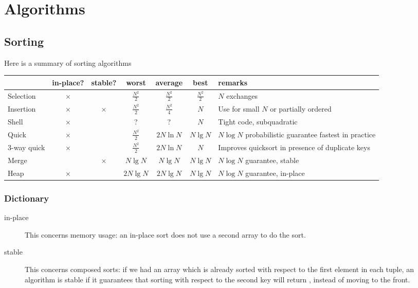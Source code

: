 \chapter{Algorithms}

\section{Sorting}
Here is a summary of sorting algorithms


\begin{tabular}{|p{15mm}||c c c c c p{2.5cm}|}
\hline
& in-place? & stable? & worst & average & best & remarks\\
\hline \hline
Selection & $\times$ & & $\frac{N^2}{2}$ & $\frac{N^2}{2}$ & $\frac{N^2}{2}$ & $N$ exchanges \\
Insertion & $\times$ & $\times$ & $\frac{N^2}{2}$ & $\frac{N^2}{4}$ & $N$ & Use for small $N$ or partially ordered \\
Shell & $\times$ &  & ? & ? & $N$ & Tight code, subquadratic \\
Quick & $\times$ & & $\frac{N^2}{2}$ & $2N \ln N$ & $N \lg N$ & $N \log N$ probabilistic guarantee fastest in practice \\
3-way quick & $\times$ & & $\frac{N^2}{2}$ & $2N \ln N$ & $N$ & Improves quicksort in presence of duplicate keys \\
Merge& & $\times$ & $N \lg N$ & $N \lg N$ & $N \lg N$ & $N \log N$ guarantee, stable \\
Heap& $\times$ & & $2 N \lg N$ & $2 N \lg N$ & $N \lg N$ & $N \log N$ guarantee, in-place \\
\hline
\end{tabular}

\subsection{Dictionary}

\begin{description}
\item[in-place] This concerns memory usage: an in-place sort does not use a 
second array to do the sort.

\item[stable] This concerns composed sorts: if we had an array 
\code{[(a, 1), (a, 2), (b, 1)]} which is already sorted with 
respect to the first element in each tuple, an algorithm is stable
if it guarantees that sorting with respect to the second key will
return \code{[(a, 1), (b, 1), (a, 2)]}, instead of moving 
to the front.
\end{description}

